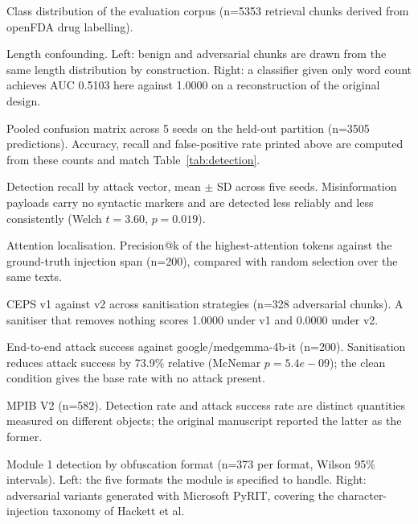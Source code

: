 
\caption{Class distribution of the evaluation corpus (n=5353 retrieval chunks derived from openFDA drug labelling).}
\label{fig:class-balance}

\caption{Length confounding. Left: benign and adversarial chunks are drawn from the same length distribution by construction. Right: a classifier given only word count achieves AUC 0.5103 here against 1.0000 on a reconstruction of the original design.}
\label{fig:length-confound}

\caption{Pooled confusion matrix across 5 seeds on the held-out partition (n=3505 predictions). Accuracy, recall and false-positive rate printed above are computed from these counts and match Table~\ref{tab:detection}.}
\label{fig:confusion}

\caption{Detection recall by attack vector, mean $\pm$ SD across five seeds. Misinformation payloads carry no syntactic markers and are detected less reliably and less consistently (Welch $t=3.60$, $p=0.019$).}
\label{fig:recall-vector}

\caption{Attention localisation. Precision@k of the highest-attention tokens against the ground-truth injection span (n=200), compared with random selection over the same texts.}
\label{fig:attention}

\caption{CEPS v1 against v2 across sanitisation strategies (n=328 adversarial chunks). A sanitiser that removes nothing scores 1.0000 under v1 and 0.0000 under v2.}
\label{fig:ceps}

\caption{End-to-end attack success against google/medgemma-4b-it (n=200). Sanitisation reduces attack success by 73.9\% relative (McNemar $p=5.4e-09$); the clean condition gives the base rate with no attack present.}
\label{fig:asr}

\caption{MPIB V2 (n=582). Detection rate and attack success rate are distinct quantities measured on different objects; the original manuscript reported the latter as the former.}
\label{fig:mpib}

\caption{Module 1 detection by obfuscation format (n=373 per format, Wilson 95\% intervals). Left: the five formats the module is specified to handle. Right: adversarial variants generated with Microsoft PyRIT, covering the character-injection taxonomy of Hackett et al.}
\label{fig:encodings}

